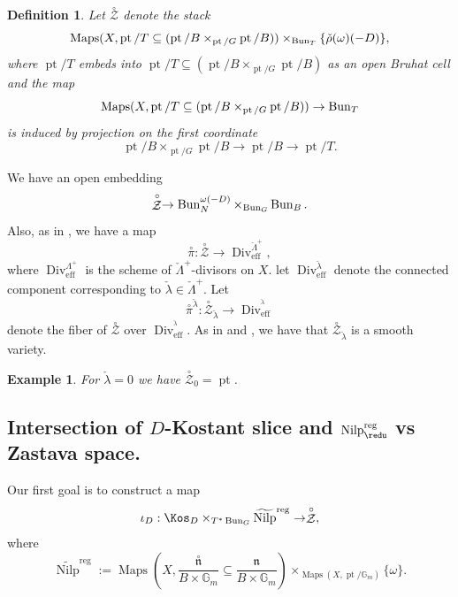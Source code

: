 \documentclass[9pt]{amsart}
\DeclareMathOperator{\pt}{{pt}}
\DeclareMathOperator{\reg}{{reg}}
\DeclareMathOperator{\Div}{{Div}}
\newcommand{\bG}{{\mathbb G}}
\newcommand{\cZ}{{\mathcal Z}}
\newcommand{\eff}{\text{eff}}
\DeclareMathOperator{\Maps}{{Maps}}
\DeclareMathOperator{\Nilp}{{Nilp}} \DeclareMathOperator{\op}{{op}}
\newtheorem{df}[subsubsection]{Definition}
\newtheorem{ex}[subsubsection]{Example}
\numberwithin{equation}{section}
\begin{document}
\begin{df}
	Let $\stackrel{\circ}{\cZ}$ denote the stack $$\Maps(X, \pt/T \subseteq (\pt/B \times_{\pt/G} \pt/B)) \times_{\Bun_T} \{ \check{\rho}(\omega)(-D) \},$$
	where $\pt/T$ embeds into $ \pt/T \subseteq (\pt/B \times_{\pt/G} \pt/B)$ as an open Bruhat cell and the map $$\Maps(X, \pt/T \subseteq (\pt/B \times_{\pt/G} \pt/B)) \rightarrow {\Bun_T}$$
	is induced by projection on the first coordinate 
	$$\pt/B \times_{\pt/G} \pt/B \rightarrow \pt/B \rightarrow \pt/T.$$
\end{df}
We have an open embedding $$\stackrel{\circ}{\cZ} \rightarrow \Bun_N^{\omega(-D)} \times_{\Bun_G} \Bun_B.$$ 
Also, as in \cite[2.11]{CPSI}, we have a map 
$$\stackrel{\circ}{\pi} : \stackrel{\circ}{\cZ} \rightarrow \Div^{\check{\Lambda}^+}_{\eff},$$
where $\Div^{\Lambda^+}_{\eff}$ is the scheme of $\check{\Lambda}^+$-divisors on $X$. let $\Div^{\check{\lambda}}_{\eff}$ denote the connected component corresponding to $\check{\lambda} \in \check{\Lambda}^+$. Let $$\stackrel{\circ}{\pi}^{\check{\lambda}} : \stackrel{\circ}{\cZ}_{\check{\lambda}} \rightarrow \Div^{^{\check{\lambda}}}_{\eff}$$
denote the fiber of $\stackrel{\circ}{\cZ}$ over $ \Div^{^{\check{\lambda}}}_{\eff}$. As in \cite{BFGM} and \cite[2.11]{CPSI}, we have that $\stackrel{\circ}{\cZ}_{\check{\lambda}}$ is a smooth variety.

\begin{ex}\label{pt}
	For $\check{\lambda}=0$ we have $\stackrel{\circ}{\cZ}_{0} = \pt$.
\end{ex}

\subsection{Intersection of $D$-Kostant slice and $\Nilp^{\reg}_{\redu}$ vs Zastava space.}

Our first goal is to construct a map $$\iota_D: \Kos_D \times_{T^* \Bun_G} \widetilde{\Nilp}^{\reg} \rightarrow \stackrel{\circ}{\cZ},$$
where $$\widetilde{\Nilp}^{\reg} := \Maps(X, \frac{\stackrel{\circ}{\mathfrak{n}}}{B \times \bG_m} \subseteq \frac{\mathfrak{n}}{B\times \bG_m})\times_{\Maps(X, \pt / \bG_m)} \{ \omega\}.$$
\end{document}
